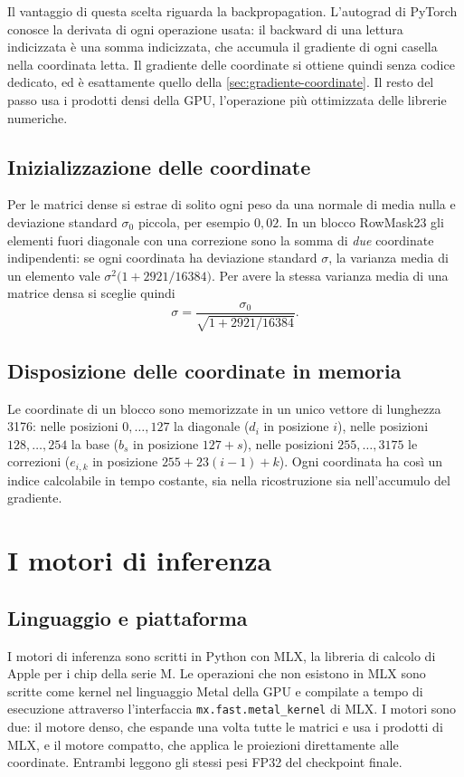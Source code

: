 Il vantaggio di questa scelta riguarda la backpropagation. L'autograd di PyTorch conosce la derivata di ogni operazione usata: il backward di una lettura indicizzata è una somma indicizzata, che accumula il gradiente di ogni casella nella coordinata letta. Il gradiente delle coordinate si ottiene quindi senza codice dedicato, ed è esattamente quello della \autoref{sec:gradiente-coordinate}. Il resto del passo usa i prodotti densi della GPU, l'operazione più ottimizzata delle librerie numeriche.

\subsection{Inizializzazione delle coordinate}
\label{sec:init-coordinate}
Per le matrici dense si estrae di solito ogni peso da una normale di media nulla e deviazione standard $\sigma_0$ piccola, per esempio $0{,}02$. In un blocco RowMask23 gli elementi fuori diagonale con una correzione sono la somma di \emph{due} coordinate indipendenti: se ogni coordinata ha deviazione standard $\sigma$, la varianza media di un elemento vale $\sigma^2\big(1 + \num{2921}/\num{16384}\big)$. Per avere la stessa varianza media di una matrice densa si sceglie quindi
\begin{equation}
\sigma = \frac{\sigma_0}{\sqrt{1+\num{2921}/\num{16384}}}.
\end{equation}


\subsection{Disposizione delle coordinate in memoria}
\label{sec:layout-coordinate}
Le coordinate di un blocco sono memorizzate in un unico vettore di lunghezza \num{3176}: nelle posizioni $0,\dots,127$ la diagonale ($d_i$ in posizione $i$), nelle posizioni $128,\dots,254$ la base ($b_s$ in posizione $127+s$), nelle posizioni $255,\dots,3175$ le correzioni ($e_{i,k}$ in posizione $255+23(i-1)+k$). Ogni coordinata ha così un indice calcolabile in tempo costante, sia nella ricostruzione sia nell'accumulo del gradiente.


\section{I motori di inferenza}
\label{sec:motori-inferenza}

\subsection{Linguaggio e piattaforma}
I motori di inferenza sono scritti in Python con MLX, la libreria di calcolo di Apple per i chip della serie M. Le operazioni che non esistono in MLX sono scritte come kernel nel linguaggio Metal della GPU e compilate a tempo di esecuzione attraverso l'interfaccia \texttt{mx.fast.metal\_kernel} di MLX. I motori sono due: il motore denso, che espande una volta tutte le matrici e usa i prodotti di MLX, e il motore compatto, che applica le proiezioni direttamente alle coordinate. Entrambi leggono gli stessi pesi FP32 del checkpoint finale.

